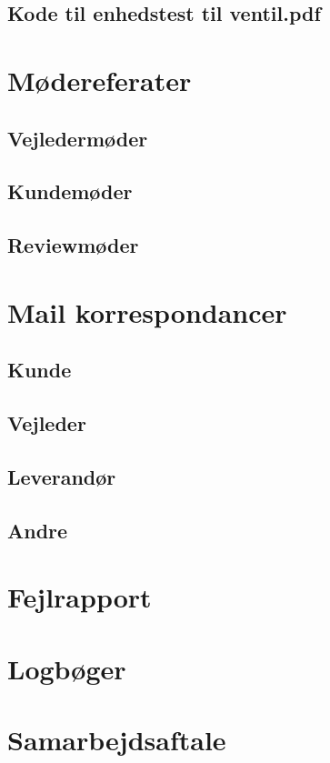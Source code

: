 \subsection{Kode til enhedstest til ventil.pdf}
\label{bilag:TKventil}
\section{Mødereferater}
\subsection{Vejledermøder}
\subsection{Kundemøder}
\subsection{Reviewmøder}
\section{Mail korrespondancer}
\subsection{Kunde}
\subsection{Vejleder}
\subsection{Leverandør}
\subsection{Andre}
\section{Fejlrapport}
\section{Logbøger}
\section{Samarbejdsaftale}
